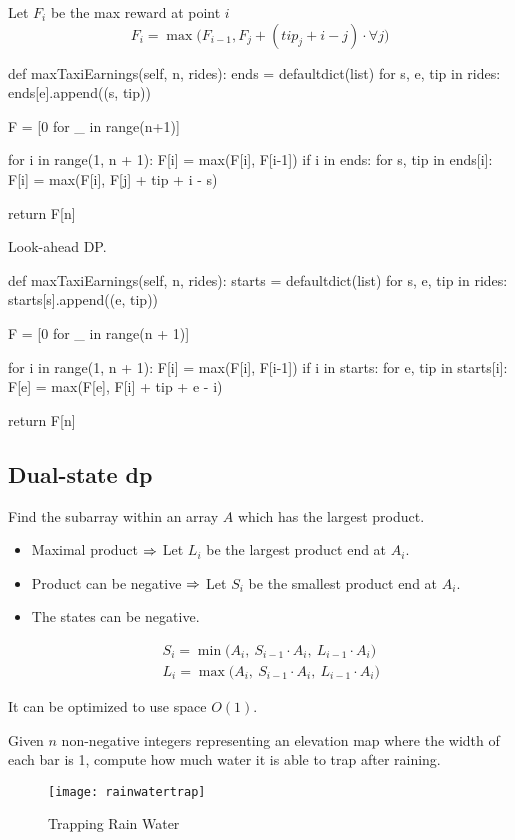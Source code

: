 Let $F_i$ be the max reward at point $i$
$$
F_i = \max\Big(F_{i-1}, F_j + (tip_j + i - j)\cdot \forall j\Big)
$$
\begin{python}
def maxTaxiEarnings(self, n, rides):
  ends = defaultdict(list)
  for s, e, tip in rides:
    ends[e].append((s, tip))

  F = [0 for _ in range(n+1)]

  for i in range(1, n + 1):
    F[i] = max(F[i], F[i-1])
    if i in ends:
      for s, tip in ends[i]:
        F[i] = max(F[i], F[j] + tip + i - s)

  return F[n]
\end{python}

Look-ahead DP.


\begin{python}
def maxTaxiEarnings(self, n, rides):
  starts = defaultdict(list)
  for s, e, tip in rides:
    starts[s].append((e, tip))

  F = [0 for _ in range(n + 1)]

  for i in range(1, n + 1):
    F[i] = max(F[i], F[i-1])
    if i in starts:
      for e, tip in starts[i]:
        F[e] = max(F[e], F[i] + tip + e - i)

  return F[n]
\end{python}




\subsection{Dual-state dp}
 Find the subarray within an array $A$ which has the largest product. 
\begin{itemize}
\item Maximal product $\Rightarrow$ Let $L_i$ be the largest product end at $A_i$.
\item Product can be negative $\Rightarrow$ Let $S_i$ be the smallest product end at $A_i$. 
\item The states can be negative. 
\end{itemize}
\begin{eqnarray*}
&& S_i = \min\Big( A_i,\ S_{i-1}\cdot A_i,\ L_{i-1}\cdot A_i \Big)
\nonumber \\
&& L_i = \max\Big( A_i,\ S_{i-1}\cdot A_i,\ L_{i-1}\cdot A_i \Big)
\end{eqnarray*}

It can be optimized to use space $O(1)$. 

Given $n$ non-negative integers representing an elevation map where the width of each
bar is 1, compute how much water it is able to trap after raining.
\begin{figure}[]
    \centerline{\texttt{[image: rainwatertrap]}}
    \caption{Trapping Rain Water}
  \label{fig:rainwatertrap}
\end{figure}

